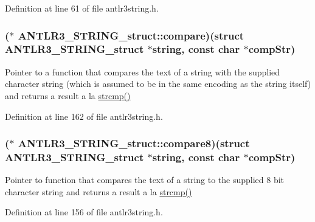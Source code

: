 Definition at line 61 of file antlr3string.\-h.

\hypertarget{struct_a_n_t_l_r3___s_t_r_i_n_g__struct_a66df83929ed437295facf03e6cc72c4d}{
\subsubsection[{compare}]{($\ast$ A\-N\-T\-L\-R3\-\_\-\-S\-T\-R\-I\-N\-G\-\_\-struct\-::compare)(struct {\bf A\-N\-T\-L\-R3\-\_\-\-S\-T\-R\-I\-N\-G\-\_\-struct} $\ast$string, const char $\ast$comp\-Str)}}\label{struct_a_n_t_l_r3___s_t_r_i_n_g__struct_a66df83929ed437295facf03e6cc72c4d}
Pointer to a function that compares the text of a string with the supplied character string (which is assumed to be in the same encoding as the string itself) and returns a result a la \hyperlink{qmb_8m_acb0bf34e5a38d0484b1e3e24b8106f52}{strcmp()} 

Definition at line 162 of file antlr3string.\-h.

\hypertarget{struct_a_n_t_l_r3___s_t_r_i_n_g__struct_abcbc344902fb72ef91bb9ae3d6a39680}{
\subsubsection[{compare8}]{($\ast$ A\-N\-T\-L\-R3\-\_\-\-S\-T\-R\-I\-N\-G\-\_\-struct\-::compare8)(struct {\bf A\-N\-T\-L\-R3\-\_\-\-S\-T\-R\-I\-N\-G\-\_\-struct} $\ast$string, const char $\ast$comp\-Str)}}\label{struct_a_n_t_l_r3___s_t_r_i_n_g__struct_abcbc344902fb72ef91bb9ae3d6a39680}
Pointer to function that compares the text of a string to the supplied 8 bit character string and returns a result a la \hyperlink{qmb_8m_acb0bf34e5a38d0484b1e3e24b8106f52}{strcmp()} 

Definition at line 156 of file antlr3string.\-h.

